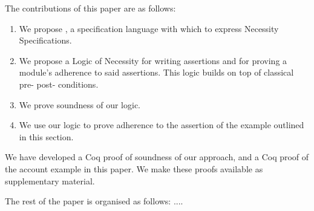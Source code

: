   
 The contributions of this paper are as follows:
 
 \begin{enumerate}
 \item
 We propose \Chainmail, a specification language with which to
express Necessity Specifications. 
 \item
  We propose a Logic of Necessity for writing assertions and for proving a module's adherence to said assertions.
 This logic builds on top of classical pre- post- conditions.
 \item
 We prove soundness of our logic.  
 \item
 We use our logic to prove adherence to the assertion of the example
outlined  in this section.
 \end{enumerate}
 
 We have developed a Coq proof of soundness of our approach, and a Coq proof of the
 account example in this paper. We make these proofs available as supplementary material.


The rest of the paper is organised as follows: .... 








